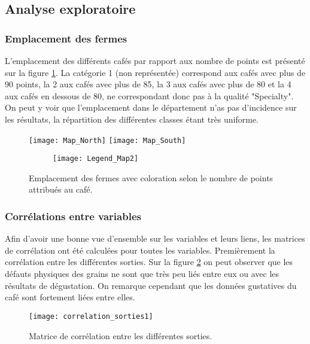 \subsection{Analyse exploratoire}


\subsubsection{Emplacement des fermes}\label{EmpFermes} L'emplacement des différents cafés par rapport aux nombre de points est présenté sur la figure \ref{FincaVSPoints}. La catégorie 1 (non représentée) correspond aux cafés avec plus de 90 points, la 2 aux cafés avec plus de 85, la 3 aux cafés avec plus de 80 et la 4 aux cafés en dessous de 80, ne correspondant donc pas à la qualité "Specialty". On peut y voir que l'emplacement dans le département n'as pas d'incidence sur les résultats, la répartition des différentes classes étant très uniforme. 


\begin{figure}[H]
	\texttt{[image: Map\_North]}
	\newline
	\newline
	\newline
	\texttt{[image: Map\_South]}
	
	\begin{figure}[H]
		\texttt{[image: Legend\_Map2]}
	\end{figure}
	\caption{\label{FincaVSPoints} Emplacement des fermes avec coloration selon le nombre de points attribués au café.}
\end{figure}


\subsubsection{Corrélations entre variables}

Afin d'avoir une bonne vue d'ensemble sur les variables et leurs liens, les matrices de corrélation ont été calculées pour toutes les variables. Premièrement la corrélation entre les différentes sorties. Sur la figure \ref{correlation_sorties1} on peut observer que les défauts physiques des grains ne sont que très peu liés entre eux ou avec les résultats de dégustation. On remarque cependant que les données gustatives du café sont fortement liées entre elles. 

\begin{figure}[H]
	\texttt{[image: correlation\_sorties1]}
	\caption{\label{correlation_sorties1} Matrice de corrélation entre les différentes sorties.}
\end{figure}


